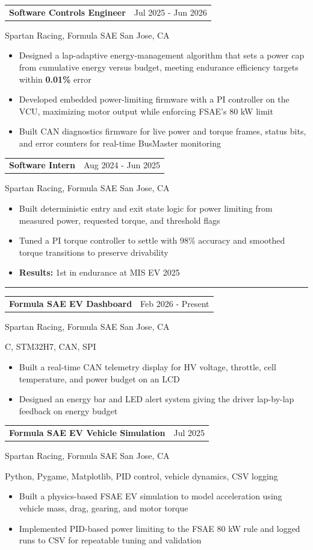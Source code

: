 \documentclass[10pt,letterpaper]{article}
\makeatletter
\newcommand{\sectionheader}[1]{%
  \vspace{4pt}
  \noindent\rule{\textwidth}{0.35pt}\par
  \vspace{4pt}
  \noindent{\fontsize{12.5}{13.5}\selectfont\textbf{#1}}\par
  \vspace{3pt}
}
\newcommand{\roleline}[2]{%
  \noindent
  \begin{tabular*}{\textwidth}{@{\extracolsep{\fill}} l r}
    \textbf{#1} & #2 \\
  \end{tabular*}
  \vspace{-2pt}
}
\newcommand{\orgline}[1]{%
  #1\par
  \vspace{1pt}
}
\newcommand{\techline}[1]{%
  #1\par
  \vspace{1pt}
}
\newcommand{\entryspace}{\vspace{2pt}}
\makeatother
\begin{document}
\entryspace

\roleline{Software Controls Engineer}{Jul 2025 - Jun 2026}
\orgline{Spartan Racing, Formula SAE\textbar{} San Jose, CA}
\begin{itemize}
  \item Designed a lap-adaptive energy-management algorithm that sets a power cap from cumulative energy versus budget, meeting endurance efficiency targets within \textbf{0.01\%} error
  \item Developed embedded power-limiting firmware with a PI controller on the VCU, maximizing motor output while enforcing FSAE's 80 kW limit
  \item Built CAN diagnostics firmware for live power and torque frames, status bits, and error counters for real-time BusMaster monitoring
\end{itemize}

\entryspace

\roleline{Software Intern}{Aug 2024 - Jun 2025}
\orgline{Spartan Racing, Formula SAE\textbar{} San Jose, CA}
\begin{itemize}
  \item Built deterministic entry and exit state logic for power limiting from measured power, requested torque, and threshold flags
  \item Tuned a PI torque controller to settle with 98\% accuracy and smoothed torque transitions to preserve drivability
  \item \textbf{Results:} 1st in endurance at MIS EV 2025
\end{itemize}

\sectionheader{PROJECT EXPERIENCE}

\roleline{Formula SAE EV Dashboard}{Feb 2026 - Present}
\orgline{Spartan Racing, Formula SAE\textbar{} San Jose, CA}
\techline{C, STM32H7, CAN, SPI}
\begin{itemize}
  \item Built a real-time CAN telemetry display for HV voltage, throttle, cell temperature, and power budget on an LCD
  \item Designed an energy bar and LED alert system giving the driver lap-by-lap feedback on energy budget
\end{itemize}

\entryspace

\roleline{Formula SAE EV Vehicle Simulation}{Jul 2025}
\orgline{Spartan Racing, Formula SAE\textbar{} San Jose, CA}
\techline{Python, Pygame, Matplotlib, PID control, vehicle dynamics, CSV logging}
\begin{itemize}
  \item Built a physics-based FSAE EV simulation to model acceleration using vehicle mass, drag, gearing, and motor torque
  \item Implemented PID-based power limiting to the FSAE 80 kW rule and logged runs to CSV for repeatable tuning and validation
\end{itemize}
\end{document}
